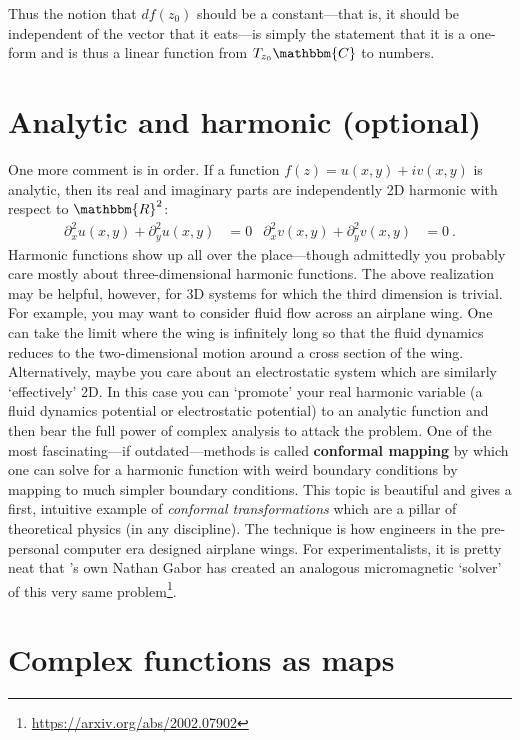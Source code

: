 Thus the notion that $df(z_0)$ should be a constant---that is, it should be independent of the vector that it eats---is simply the statement that it is a one-form and is thus a linear function from $T_{z_0}\mathbbm{C}$ to numbers.

\section{Analytic and harmonic (optional)}

One more comment is in order. If a function $f(z) = u(x,y)+ i v(x,y)$ is analytic, then its real and imaginary parts are independently 2D harmonic with respect to $\mathbbm{R}^2$:
\begin{align}
  \partial_x^2 u(x,y) + \partial_y^2 u(x,y) &= 0
  &
  \partial_x^2 v(x,y) + \partial_y^2 v(x,y) &= 0 \ .
\end{align}
Harmonic functions show up all over the place---though admittedly you probably care mostly about three-dimensional harmonic functions. The above realization may be helpful, however, for 3D systems for which the third dimension is trivial. For example, you may want to consider fluid flow across an airplane wing. One can take the limit where the wing is infinitely long so that the fluid dynamics reduces to the two-dimensional motion around a cross section of the wing. Alternatively, maybe you care about an electrostatic system which are similarly `effectively' 2D. In this case you can `promote' your real harmonic variable (a fluid dynamics potential or electrostatic potential) to an analytic function and then bear the full power of complex analysis to attack the problem. One of the most fascinating---if outdated---methods is called \textbf{conformal mapping} by which one can solve for a harmonic function with weird boundary conditions by mapping to much simpler boundary conditions. This topic is beautiful and gives a first, intuitive example of \emph{conformal transformations} which are a pillar of theoretical physics (in any discipline). The technique is how engineers in the pre-personal computer era designed airplane wings. For experimentalists, it is pretty neat that 's own Nathan Gabor has created an analogous micromagnetic `solver' of this very same problem\footnote{\url{https://arxiv.org/abs/2002.07902}}.


\section{Complex functions as maps}

